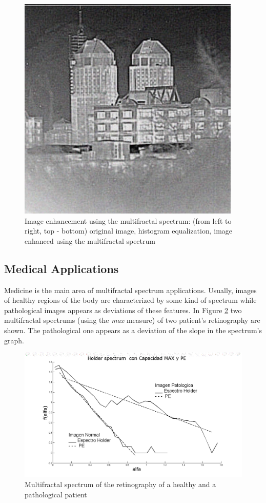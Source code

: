 \documentclass[oneside,a4paper,english,links,12pt]{article}
\begin{document}
\begin{figure}[htb]
\includegraphics[scale=0.35]{imagenes/enhancemfs}
\caption{Image enhancement using the multifractal spectrum: (from left to right, top - bottom) original image, histogram equalization, image enhanced using the multifractal spectrum}
\label{fig:camera}
\end{figure}

\subsection{Medical Applications}
Medicine is the main area of multifractal spectrum applications. Usually, images of healthy regions of the body are characterized by some kind of spectrum while pathological images appears as deviations of these features. In Figure \ref{fig:medical} two multifractal spectrums (using the {\em max} measure) of two patient's retinography are shown. The pathological one appears as a deviation of the slope in the spectrum's graph.

\begin{figure}[htb]
\centering
\includegraphics[scale=0.25]{imagenes/medicalgraph}
\caption{Multifractal spectrum of the retinography of a healthy and a pathological patient}
\label{fig:medical}
\end{figure}
\end{document}
